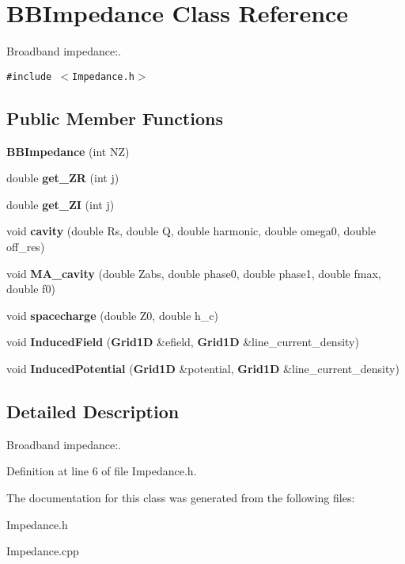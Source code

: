 \section{BBImpedance Class Reference}
\label{classBBImpedance}
Broadband impedance:.  


{\tt \#include $<$Impedance.h$>$}

\subsection*{Public Member Functions}
\begin{CompactItemize}
\item 
\textbf{BBImpedance} (int NZ)\label{classBBImpedance_51d7134c41b2775f5f145ece3c36e847}

\item 
double \textbf{get\_\-ZR} (int j)\label{classBBImpedance_6f19f1dcb80ab0d2ceadbab7c9b33930}

\item 
double \textbf{get\_\-ZI} (int j)\label{classBBImpedance_535861abbbe4c4f495726cd0b00493d8}

\item 
void \textbf{cavity} (double Rs, double Q, double harmonic, double omega0, double off\_\-res)\label{classBBImpedance_e16733d6333dedd7e2fe3ef437f0e5a6}

\item 
void \textbf{MA\_\-cavity} (double Zabs, double phase0, double phase1, double fmax, double f0)\label{classBBImpedance_050635ed811573f32f0aed661a94c2ef}

\item 
void \textbf{spacecharge} (double Z0, double h\_\-c)\label{classBBImpedance_929be304dd30e77b7b613933bf0fae1c}

\item 
void \textbf{InducedField} ({\bf Grid1D} \&efield, {\bf Grid1D} \&line\_\-current\_\-density)\label{classBBImpedance_4ab624c3fe9fc5b0f15f718c28b3df75}

\item 
void \textbf{InducedPotential} ({\bf Grid1D} \&potential, {\bf Grid1D} \&line\_\-current\_\-density)\label{classBBImpedance_f79e3a40ec8dd010ccf36b7d087637d2}

\end{CompactItemize}


\subsection{Detailed Description}
Broadband impedance:. 

Definition at line 6 of file Impedance.h.

The documentation for this class was generated from the following files:\begin{CompactItemize}
\item 
Impedance.h\item 
Impedance.cpp\end{CompactItemize}
